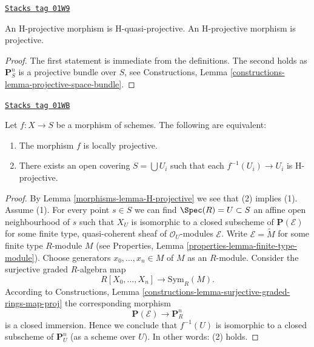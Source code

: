 \begin{lemma}[H projective]
\label{morphisms-lemma-H-projective}
\href{https://stacks.math.columbia.edu/tag/01W9}{\texttt{Stacks tag 01W9}}

An H-projective morphism is H-quasi-projective.
An H-projective morphism is projective.
\end{lemma}

\begin{proof}
The first statement is immediate from the definitions.
The second holds as $\mathbf{P}^n_S$ is a projective bundle over $S$, see
Constructions, Lemma \ref{constructions-lemma-projective-space-bundle}.
\end{proof}

\begin{lemma}
\label{morphisms-lemma-characterize-locally-projective}
\href{https://stacks.math.columbia.edu/tag/01WB}{\texttt{Stacks tag 01WB}}

Let $f : X \to S$ be a morphism of schemes.
The following are equivalent:
\begin{enumerate}
\item The morphism $f$ is locally projective.
\item There exists an open covering $S = \bigcup U_i$ such
that each $f^{-1}(U_i) \to U_i$ is H-projective.
\end{enumerate}
\end{lemma}

\begin{proof}

By Lemma \ref{morphisms-lemma-H-projective} we see that (2) implies (1). Assume (1).
For every point $s \in S$ we can find $\Spec(R) = U \subset S$
an affine open neighbourhood of $s$ such that $X_U$ is isomorphic to a
closed subscheme of $\mathbf{P}(\mathcal{E})$ for some finite type,
quasi-coherent sheaf of $\mathcal{O}_U$-modules $\mathcal{E}$.
Write $\mathcal{E} = \widetilde{M}$ for some finite type
$R$-module $M$ (see
Properties, Lemma \ref{properties-lemma-finite-type-module}).
Choose generators $x_0, \ldots, x_n \in M$ of $M$ as an $R$-module.
Consider the surjective graded $R$-algebra map
$$
R[X_0, \ldots, X_n] \longrightarrow \text{Sym}_R(M).
$$
According to
Constructions, Lemma \ref{constructions-lemma-surjective-graded-rings-map-proj}
the corresponding morphism
$$
\mathbf{P}(\mathcal{E}) \to \mathbf{P}^n_R
$$
is a closed immersion. Hence we conclude that $f^{-1}(U)$ is isomorphic
to a closed subscheme of $\mathbf{P}^n_U$ (as a scheme over $U$).
In other words: (2) holds.
\end{proof}

